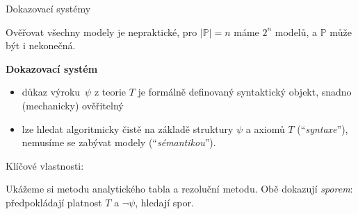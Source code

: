 \documentclass{beamer}
\begin{document}
\begin{frame}{Dokazovací systémy}

    Ověřovat všechny modely je nepraktické, pro $|\mathbb P|=n$ máme $2^n$ modelů, a $\mathbb P$ může být i nekonečná.

    \textbf{Dokazovací systém}
    \begin{itemize}
        \item \alert{důkaz} výroku~\( \psi \) z teorie \(T\) je formálně definovaný syntaktický objekt, snadno (mechanicky) ověřitelný
        \item lze hledat algoritmicky čistě na základě struktury \( \psi \) a axiomů \(T\) (``\emph{syntaxe}''), nemusíme se zabývat modely (``\emph{sémantikou}'').
    \end{itemize}        
    Klíčové vlastnosti:


    Ukážeme si \alert{metodu analytického tabla} a \alert{rezoluční metodu}. Obě dokazují \emph{sporem}: předpokládají platnost $T$ a \( \neg \psi \), hledají spor.

\end{frame}
\end{document}
